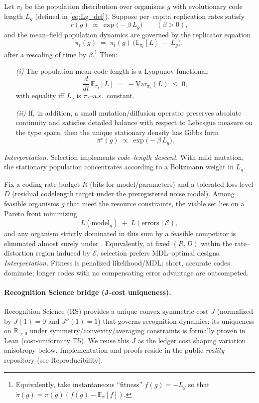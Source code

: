\documentclass[11pt,a4paper]{article}
\newcommand{\E}{\mathbb{E}}
\begin{document}
\begin{theorem}\label{thm:replicator-mdl}
Let $\pi_t$ be the population distribution over organisms $g$ with evolutionary code length $L_g$ (defined in \eqref{eq:Lg_def}). Suppose per–capita replication rates satisfy
\[
r(g)\ \propto\ \exp\!\big(-\beta\,L_g\big)\qquad(\beta>0),
\]
and the mean–field population dynamics are governed by the replicator equation
\[
\dot{\pi}_t(g)\;=\;\pi_t(g)\,\Big(\E_{\pi_t}[L]\;-\;L_g\Big),
\]
after a rescaling of time by $\beta$.\footnote{Equivalently, take instantaneous ``fitness'' $f(g)=-L_g$ so that $\dot\pi(g)=\pi(g)(f(g)-\E_\pi[f])$.}
Then:
\begin{enumerate}
  \item[\emph{(i)}] The population mean code length is a Lyapunov functional:
  \[
  \frac{d}{dt}\,\E_{\pi_t}[L]\;=\;-\mathrm{Var}_{\pi_t}(L)\;\le\;0,
  \]
  with equality iff $L_g$ is $\pi_t$–a.s.\ constant.
  \item[\emph{(ii)}] If, in addition, a small mutation/diffusion operator preserves absolute continuity and satisfies detailed balance with respect to Lebesgue measure on the type space, then the unique stationary density has Gibbs form
  \[
  \pi^\star(g)\ \propto\ \exp\!\big(-\beta\,L_g\big).
  \]
\end{enumerate}
\emph{Interpretation.} Selection implements \emph{code–length descent}. With mild mutation, the stationary population concentrates according to a Boltzmann weight in $L_g$.
\end{theorem}

\begin{proposition}\label{prop:rd-fitness}
Fix a coding rate budget $R$ (bits for model/parameters) and a tolerated loss level $D$ (residual codelength target under the preregistered noise model). Among feasible organisms $g$ that meet the resource constraints, the viable set lies on a Pareto front minimizing
\[
L(\text{model}_g)\;+\;L(\text{errors}\mid\mathcal{E}),
\]
and any organism strictly dominated in this sum by a feasible competitor is eliminated almost surely under . Equivalently, at fixed $(R,D)$ within the rate–distortion region induced by $\mathcal{E}$, selection prefers MDL–optimal designs.
\emph{Interpretation.} Fitness is penalized likelihood/MDL: short, accurate codes dominate; longer codes with no compensating error advantage are outcompeted.
\end{proposition}

\paragraph{Recognition Science bridge (J-cost uniqueness).}
Recognition Science (RS) provides a unique convex symmetric cost $J$ (normalized by $J(1)=0$ and $J''(1)=1$) that governs recognition dynamics; its uniqueness on $\mathbb{R}_{>0}$ under symmetry/convexity/averaging constraints is formally proven in Lean (cost-uniformity T5). We reuse this $J$ as the ledger cost shaping variation anisotropy below. Implementation and proofs reside in the public \emph{reality} repository (see Reproducibility).
\end{document}
